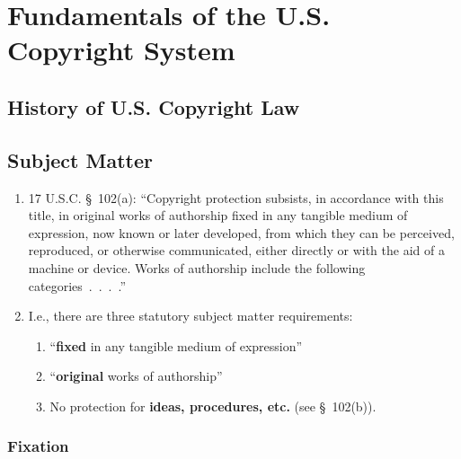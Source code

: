 \section{Fundamentals of the U.S. Copyright System}

\subsection{History of U.S. Copyright Law}


\subsection{Subject Matter}

\begin{enumerate}
    \item 17 U.S.C. \S\ 102(a): ``Copyright protection subsists, in accordance 
    with this title, in original works of authorship fixed in any tangible 
    medium of expression, now known or later developed, from which they can be 
    perceived, reproduced, or otherwise communicated, either directly or with 
    the aid of a machine or device. Works of authorship include the following 
    categories~.~.~.~.''
    \item I.e., there are three statutory subject matter requirements:
    \begin{enumerate}
        \item ``\textbf{fixed} in any tangible medium of expression''
        \item ``\textbf{original} works of authorship''
        \item No protection for \textbf{ideas, procedures, etc.} (see \S\ 
        102(b)).
    \end{enumerate}
\end{enumerate}

\subsubsection{Fixation}

